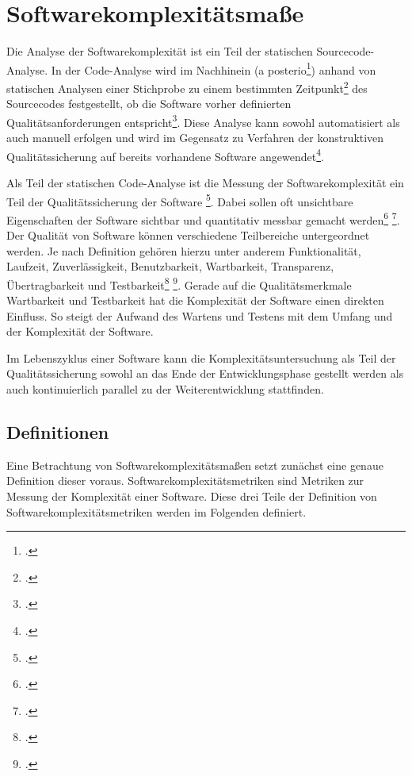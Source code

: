 \chapter{Softwarekomplexitätsma\ss e}\label{softwarekomplexituxe4tsmauxdfe}

Die Analyse der Softwarekomplexität ist ein Teil der statischen
Sourcecode-Analyse. In der Code-Analyse wird im Nachhinein (a
posterio\footcite[Vgl. ][S. 261]{hoffmannSoftwareQualitat2013}) anhand von statischen
Analysen einer Stichprobe zu einem bestimmten Zeitpunkt\footcite[Vgl. ][S. 86]{ebertSoftwareMetrikenPraxisEinfuhrung1996} des Sourcecodes festgestellt, ob die Software vorher
definierten Qualitätsanforderungen entspricht\footcite[Vgl. ][S. 261]{ebertSoftwareMetrikenPraxisEinfuhrung1996}.
Diese Analyse kann sowohl automatisiert als auch manuell erfolgen und
wird im Gegensatz zu Verfahren der konstruktiven Qualitätssicherung auf
bereits vorhandene Software angewendet\footcite[Vgl. ][S. 261]{hoffmannSoftwareQualitat2013}.

Als Teil der statischen Code-Analyse ist die Messung der
Softwarekomplexität ein Teil der Qualitätssicherung der
Software \footcite[Vgl. ][S. 261]{hoffmannSoftwareQualitat2013}. Dabei
sollen oft unsichtbare Eigenschaften der Software sichtbar und
quantitativ messbar gemacht werden\footcite[Vgl. ][S. 261]{hoffmannSoftwareQualitat2013}
\footcite[Vgl. ][S. 561]{zuseSoftwareComplexityMeasures1991}. Der Qualität von Software können
verschiedene Teilbereiche untergeordnet werden. Je nach Definition
gehören hierzu unter anderem Funktionalität, Laufzeit, Zuverlässigkeit,
Benutzbarkeit, Wartbarkeit, Transparenz, Übertragbarkeit und
Testbarkeit\footcite[Vgl. ][S. 22f]{hoffmannSoftwareQualitat2013} \footcite[Vgl. ][S. 245]{liggesmeyerSoftwareQualitatTestenAnalysieren2009}. Gerade auf die Qualitätsmerkmale Wartbarkeit und
Testbarkeit hat die Komplexität der Software einen direkten Einfluss. So
steigt der Aufwand des Wartens und Testens mit dem Umfang und der
Komplexität der Software.

Im Lebenszyklus einer Software kann die Komplexitätsuntersuchung als
Teil der Qualitätssicherung sowohl an das Ende der Entwicklungsphase
gestellt werden als auch kontinuierlich parallel zu der
Weiterentwicklung stattfinden.

\section{Definitionen}\label{definitionen}

Eine Betrachtung von Softwarekomplexitätsma\ss en setzt zunächst eine
genaue Definition dieser voraus. Softwarekomplexitätsmetriken sind
Metriken zur Messung der Komplexität einer Software. Diese drei Teile
der Definition von Softwarekomplexitätsmetriken werden im Folgenden
definiert.

